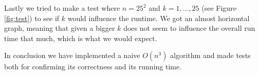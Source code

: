 \begin{center}

\end{center}

Lastly we tried to make a test where $n=25^2$ and $k=1,\dots,25$ (see Figure
\ref{fig:test}) to see if $k$ would influence the runtime. We got an almost
horizontal graph, meaning that given a bigger $k$ does not seem to influence the
overall run time that much, which is what we would expect.

\begin{center}

\end{center}

In conclusion we have implemented a naive $O(n^3)$ algorithm and made tests both
for confirming its correctness and its running time.

